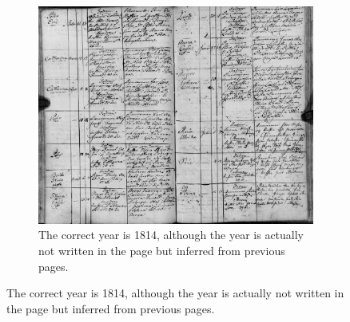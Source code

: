 
\begin{figure}
    \centering
    \begin{subfigure}[c]{1.0\textwidth}
        \centering    \includegraphics[scale=0.29]{resources/SWE_attention/S3HY-DRC3-H5L.jpg}
        \caption{The correct year is 1814, although the year is actually not written in the page but inferred from previous pages.}
    \end{subfigure}
    
    \vspace{1em}
    

\end{figure}
